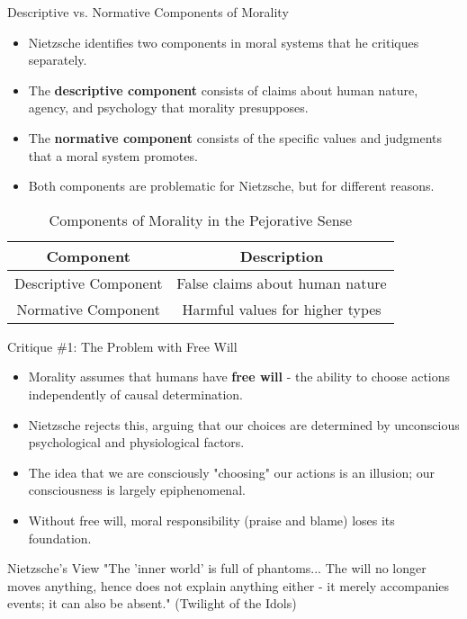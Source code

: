 \documentclass{beamer}
\begin{document}
        \begin{frame}{Descriptive vs. Normative Components of Morality}
        \begin{itemize}
        \item Nietzsche identifies two components in moral systems that he critiques separately.
        \item The \textbf{descriptive component} consists of claims about human nature, agency, and psychology that morality presupposes.
        \item The \textbf{normative component} consists of the specific values and judgments that a moral system promotes.
        \item Both components are problematic for Nietzsche, but for different reasons.
        \end{itemize}
        
        \begin{table}
        \centering
        \begin{tabular}{|c|c|}
        \hline
        \textbf{Component} & \textbf{Description} \\
        \hline
        Descriptive Component & False claims about human nature \\
        \hline
        Normative Component & Harmful values for higher types \\
        \hline
        \end{tabular}
        \caption{Components of Morality in the Pejorative Sense}
        \end{table}   
    \end{frame}
        
        \begin{frame}{Critique \#1: The Problem with Free Will}
        \begin{itemize}
        \item Morality assumes that humans have \textbf{free will} - the ability to choose actions independently of causal determination.
        \item Nietzsche rejects this, arguing that our choices are determined by unconscious psychological and physiological factors.
        \item The idea that we are consciously "choosing" our actions is an illusion; our consciousness is largely epiphenomenal.
        \item Without free will, moral responsibility (praise and blame) loses its foundation.
        \end{itemize}
        
        \begin{exampleblock}{Nietzsche's View}
        "The 'inner world' is full of phantoms... The will no longer moves anything, hence does not explain anything either - it merely accompanies events; it can also be absent." (Twilight of the Idols)
        \end{exampleblock}
        \end{frame}
        
\end{document}
